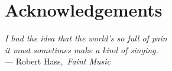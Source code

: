 


\begingroup

\let\clearpage\relax
\let\cleardoublepage\relax
\let\cleardoublepage\relax

\chapter*{Acknowledgements} %

\begin{flushright}{\slshape    
    I had the idea that the world's so full of pain \\
    it must sometimes make a kind of singing.} \\\medskip
    --- Robert Hass,\, \emph{Faint Music}~\cite{Hass:1998}
\end{flushright}


\bigskip






